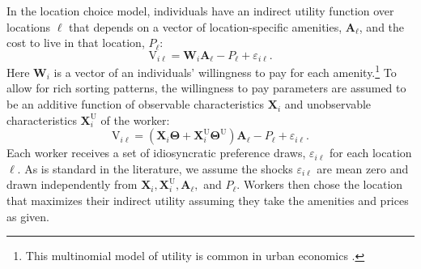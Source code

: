 \documentclass[12pt]{article}
\begin{document}
In the location choice model, individuals have an indirect utility function over locations $\ell$ that depends on a vector of location-specific amenities, $\bm{A}_\ell$, and the cost to live in that location, ${P}_\ell$: 
\begin{equation}
    \text{V}_{i \ell} = \bm{W}_i \bm{A}_\ell - {P}_\ell + \varepsilon_{i \ell} .
\end{equation} 
Here $\bm{W}_i$ is a vector of an individuals' willingness to pay for each amenity.\footnote{
  This multinomial model of utility is common in urban economics \citep*[e.g.][]{Kline_Moretti_2014,diamond2021spatial}.
}
To allow for rich sorting patterns, the willingness to pay parameters are assumed to be an additive function of observable characteristics $\bm{X}_i$ and unobservable characteristics $\bm{X}_i^\text{U}$ of the worker:
\begin{equation}\label{eq:loc choice sub}
    \text{V}_{i \ell} = (\bm{X}_i \bm{\Theta} + \bm{X}_i^\text{U} \bm{\Theta}^\text{U}) \bm{A}_\ell - {P}_\ell + \varepsilon_{i \ell}.
\end{equation} 
Each worker receives a set of idiosyncratic preference draws, $\varepsilon_{i \ell}$ for each location $\ell$.
As is standard in the literature, we assume the shocks $\varepsilon_{i \ell}$ are mean zero and drawn independently from $\bm{X}_i, \bm{X}_i^{\text{U}}, \bm{A}_\ell,$ and $P_\ell$. 
Workers then chose the location that maximizes their indirect utility assuming they take the amenities and prices as given.

\end{document}
